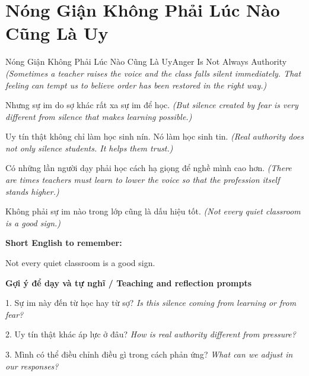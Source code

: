 \section{Nóng Giận Không Phải Lúc Nào Cũng Là Uy}
\begin{truyen}{Nóng Giận Không Phải Lúc Nào Cũng Là Uy}{Anger Is Not Always Authority}
\textit{(Sometimes a teacher raises the voice and the class falls silent immediately. That feeling can tempt us to believe order has been restored in the right way.)}

Nhưng sự im do sợ khác rất xa sự im để học.
\textit{(But silence created by fear is very different from silence that makes learning possible.)}

Uy tín thật không chỉ làm học sinh nín. Nó làm học sinh tin.
\textit{(Real authority does not only silence students. It helps them trust.)}

Có những lần người dạy phải học cách hạ giọng để nghề mình cao hơn.
\textit{(There are times teachers must learn to lower the voice so that the profession itself stands higher.)}

\end{truyen}

\begin{baihoc}
Không phải sự im nào trong lớp cũng là dấu hiệu tốt.
\textit{(Not every quiet classroom is a good sign.)}
\end{baihoc}

\begin{ghinhoanh}
\textbf{Short English to remember:}

Not every quiet classroom is a good sign.

\end{ghinhoanh}

\begin{tuhocnhanh}
\textbf{Gợi ý để dạy và tự nghĩ / Teaching and reflection prompts}

1. Sự im này đến từ học hay từ sợ? \textit{Is this silence coming from learning or from fear?}

2. Uy tín thật khác áp lực ở đâu? \textit{How is real authority different from pressure?}

3. Mình có thể điều chỉnh điều gì trong cách phản ứng? \textit{What can we adjust in our responses?}
\end{tuhocnhanh}
\ngancach

